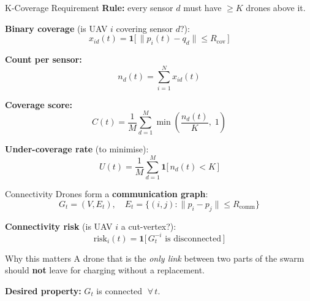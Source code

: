 \documentclass[aspectratio=169,12pt]{beamer}
\begin{document}
\begin{frame}{K-Coverage Requirement}
\textbf{Rule:} every sensor $d$ must have $\ge K$ drones above it.

\vspace{0.4em}
\textbf{Binary coverage} (is UAV $i$ covering sensor $d$?):
\[
x_{id}(t) = \mathbf{1}\!\bigl[\,\|p_i(t) - q_d\| \le R_{\text{cov}}\,\bigr]
\]

\vspace{0.3em}
\textbf{Count per sensor:}
\[
n_d(t) = \sum_{i=1}^{N} x_{id}(t)
\]

\vspace{0.3em}
\textbf{Coverage score:}
\[
C(t) = \frac{1}{M}\sum_{d=1}^{M} \min\!\left(\frac{n_d(t)}{K},\; 1\right)
\]

\vspace{0.3em}
\textbf{Under-coverage rate} (to minimise):
\[
U(t) = \frac{1}{M}\sum_{d=1}^{M} \mathbf{1}\!\bigl[\,n_d(t) < K\,\bigr]
\]
\end{frame}

\begin{frame}{Connectivity}
Drones form a \textbf{communication graph}:
\[
G_t = (V, E_t),
\quad
E_t = \bigl\{(i,j) : \|p_i - p_j\| \le R_{\text{comm}}\bigr\}
\]

\vspace{0.5em}
\textbf{Connectivity risk} (is UAV $i$ a cut-vertex?):
\[
\text{risk}_i(t) = \mathbf{1}\!\bigl[\,G_t^{-i} \text{ is disconnected}\,\bigr]
\]

\vspace{0.5em}
\begin{block}{Why this matters}
A drone that is the \emph{only link} between two parts of the swarm
should \textbf{not} leave for charging without a replacement.
\end{block}

\vspace{0.3em}
\textbf{Desired property:}
$G_t$ is connected $\;\forall\, t$.
\end{frame}
\end{document}
